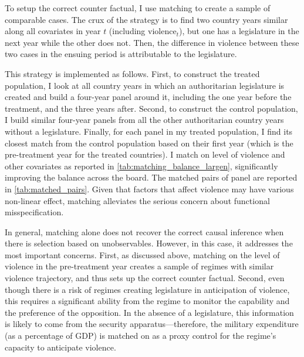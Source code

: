 To setup the correct counter factual, I use matching to create a sample of comparable cases. The crux of the strategy is to find two country years similar along all covariates in year $t$ (including $\text{violence}_t$), but one has a legislature in the next year while the other does not. Then, the difference in violence between these two cases in the ensuing period is attributable to the legislature.

This strategy is implemented as follows. First, to construct the treated population, I look at all country years in which an authoritarian legislature is created and build a four-year panel around it, including the one year before the treatment, and the three years after. Second, to construct the control population, I build similar four-year panels from all the other authoritarian country years without a legislature. Finally, for each panel in my treated population, I find its closest match from the control population based on their first year (which is the pre-treatment year for the treated countries). I match on level of violence and other covariates as reported in \autoref{tab:matching_balance_largen}, significantly improving the balance across the board. The matched pairs of panel are reported in \autoref{tab:matched_pairs}. Given that factors that affect violence may have various non-linear effect, matching alleviates the serious concern about functional misspecification. 

In general, matching alone does not recover the correct causal inference when there is selection based on unobservables. However, in this case, it addresses the most important concerns. First, as discussed above, matching on the level of violence in the pre-treatment year creates a sample of regimes with similar violence trajectory, and thus sets up the correct counter factual. Second, even though there is a risk of regimes creating legislature in anticipation of violence, this requires a significant ability from the regime to monitor the capability and the preference of the opposition. In the absence of a legislature, this information is likely to come from the security apparatus---therefore, the military expenditure (as a percentage of GDP) is matched on as a proxy control for the regime's capacity to anticipate violence.


